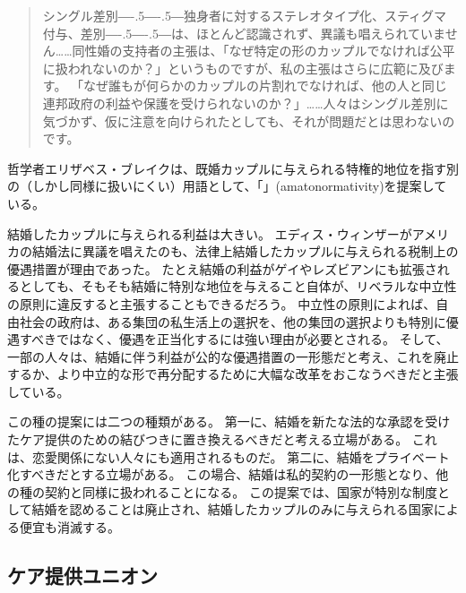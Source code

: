 \documentclass[paper=a4,book,openany]{jlreq}
\def\DDASH{―\kern-.5\zw―\kern-.5\zw―} %
\begin{document}
\begin{quote}
  シングル差別{\DDASH}独身者に対するステレオタイプ化、スティグマ付与、差別{\DDASH}は、ほとんど認識されず、異議も唱えられていません……同性婚の支持者の主張は、「なぜ特定の形のカップルでなければ公平に扱われないのか？」というものですが、私の主張はさらに広範に及びます。
「なぜ誰もが何らかのカップルの片割れでなければ、他の人と同じ連邦政府の利益や保護を受けられないのか？」……人々はシングル差別に気づかず、仮に注意を向けられたとしても、それが問題だとは思わないのです。
\citep{kelly12:_singl_out}

\end{quote}

哲学者エリザベス・ブレイクは、既婚カップルに与えられる特権的地位を指す別の（しかし同様に扱いにくい）用語として、「」(amatonormativity)を提案している。

結婚したカップルに与えられる利益は大きい\citep[pp.380--381]{sunstein08:_privat_marriag}。
エディス・ウィンザーがアメリカの結婚法に異議を唱えたのも、法律上結婚したカップルに与えられる税制上の優遇措置が理由であった。
たとえ結婚の利益がゲイやレズビアンにも拡張されるとしても、そもそも結婚に特別な地位を与えること自体が、リベラルな中立性の原則に違反すると主張することもできるだろう。
中立性の原則によれば、自由社会の政府は、ある集団の私生活上の選択を、他の集団の選択よりも特別に優遇すべきではなく、優遇を正当化するには強い理由が必要とされる。
そして、一部の人々は、結婚に伴う利益が公的な優遇措置の一形態だと考え、これを廃止するか、より中立的な形で再分配するために大幅な改革をおこなうべきだと主張している。

この種の提案には二つの種類がある。
第一に、結婚を新たな法的な承認を受けたケア提供のための結びつきに置き換えるべきだと考える立場がある。
これは、恋愛関係にない人々にも適用されるものだ。
第二に、結婚をプライベート化すべきだとする立場がある。
この場合、結婚は私的契約の一形態となり、他の種の契約と同様に扱われることになる。
この提案では、国家が特別な制度として結婚を認めることは廃止され、結婚したカップルのみに与えられる国家による便宜も消滅する。

\subsection{ケア提供ユニオン}
\end{document}
